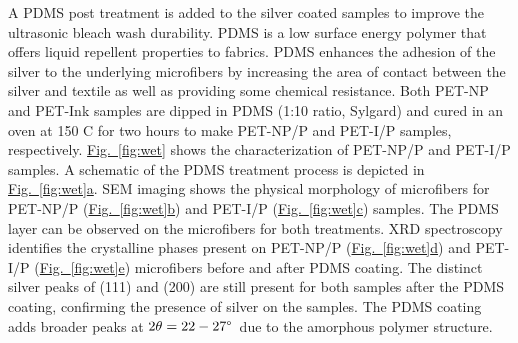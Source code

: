 \documentclass[journal=jacsat,manuscript=article]{achemso}
\newcommand{\figref}[2][]{\hyperref[#2]{Fig.~\ref{#2}#1}}
\begin{document}
A PDMS post treatment is added to the silver coated samples to improve the ultrasonic bleach wash durability. PDMS is a low surface energy polymer that offers liquid repellent properties to fabrics.\cite{ye_2018} 
PDMS enhances the adhesion of the silver to the underlying microfibers by increasing the area of contact between the silver and textile as well as providing some chemical resistance.  
Both PET-NP and PET-Ink samples are dipped in PDMS (1:10 ratio, Sylgard) and cured in an oven at 150 \degree C for two hours to make PET-NP/P and PET-I/P samples, respectively. 
\figref{fig:wet} shows the characterization of PET-NP/P and PET-I/P samples. A schematic of the  PDMS treatment process is depicted in \figref[a]{fig:wet}.
SEM imaging shows the physical morphology of microfibers for PET-NP/P (\figref[b]{fig:wet}) and PET-I/P (\figref[c]{fig:wet}) samples. The PDMS layer can be observed on the microfibers for both treatments. 
XRD spectroscopy identifies the crystalline phases present on PET-NP/P (\figref[d]{fig:wet}) and PET-I/P (\figref[e]{fig:wet}) microfibers before and after PDMS coating. The distinct silver peaks of (111) and (200) are still present for both samples after the PDMS coating, confirming the presence of silver on the samples. The PDMS coating adds broader peaks at $2\theta = 22-27\degree$~due to the amorphous polymer structure. 
\end{document}
